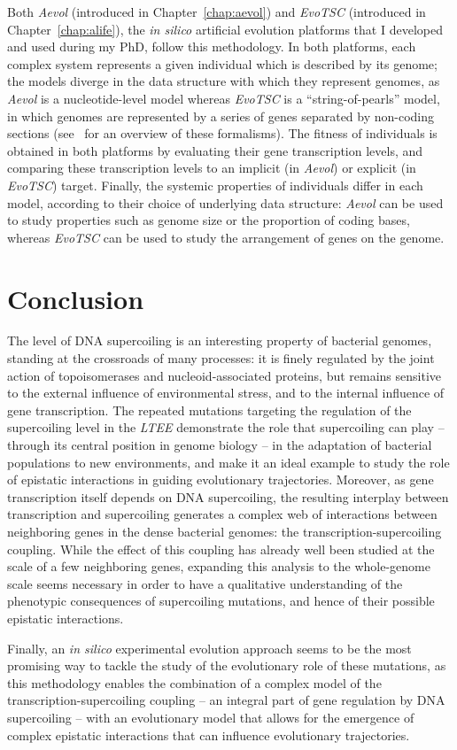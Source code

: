 Both \emph{Aevol} (introduced in Chapter~\ref{chap:aevol}) and \emph{EvoTSC} (introduced in Chapter~\ref{chap:alife}), the \emph{in silico} artificial evolution platforms that I developed and used during my PhD, follow this methodology.
In both platforms, each complex system represents a given individual which is described by its genome; the models diverge in the data structure with which they represent genomes, as \emph{Aevol} is a nucleotide-level model whereas \emph{EvoTSC} is a ``string-of-pearls'' model, in which genomes are represented by a series of genes separated by non-coding sections (see~\cite{hindre2012} for an overview of these formalisms).
The fitness of individuals is obtained in both platforms by evaluating their gene transcription levels, and comparing these transcription levels to an implicit (in \emph{Aevol}) or explicit (in \emph{EvoTSC}) target.
Finally, the systemic properties of individuals differ in each model, according to their choice of underlying data structure: \emph{Aevol} can be used to study properties such as genome size or the proportion of coding bases, whereas \emph{EvoTSC} can be used to study the arrangement of genes on the genome.


\section{Conclusion}

The level of DNA supercoiling is an interesting property of bacterial genomes, standing at the crossroads of many processes: it is finely regulated by the joint action of topoisomerases and nucleoid-associated proteins, but remains sensitive to the external influence of environmental stress, and to the internal influence of gene transcription.
The repeated mutations targeting the regulation of the supercoiling level in the \emph{LTEE} demonstrate the role that supercoiling can play -- through its central position in genome biology -- in the adaptation of bacterial populations to new environments, and make it an ideal example to study the role of epistatic interactions in guiding evolutionary trajectories.
Moreover, as gene transcription itself depends on DNA supercoiling, the resulting interplay between transcription and supercoiling generates a complex web of interactions between neighboring genes in the dense bacterial genomes: the transcription-supercoiling coupling.
While the effect of this coupling has already well been studied at the scale of a few neighboring genes, expanding this analysis to the whole-genome scale seems necessary in order to have a qualitative understanding of the phenotypic consequences of supercoiling mutations, and hence of their possible epistatic interactions.

Finally, an \emph{in silico} experimental evolution approach seems to be the most promising way to tackle the study of the evolutionary role of these mutations, as this methodology enables the combination of a complex model of the transcription-supercoiling coupling -- an integral part of gene regulation by DNA supercoiling -- with an evolutionary model that allows for the emergence of complex epistatic interactions that can influence evolutionary trajectories.
